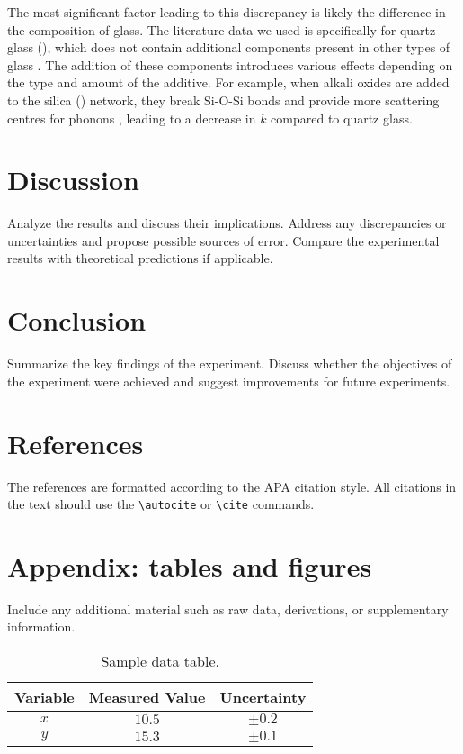 \documentclass[a4paper,12pt]{article}
\begin{document}
The most significant factor leading to this discrepancy is likely the difference in the composition of glass. The literature data we used is specifically for quartz glass (), which does not contain additional components present in other types of glass \autocite{onoda1999introduction}. The addition of these components introduces various effects depending on the type and amount of the additive. For example, when alkali oxides are added to the silica () network, they break Si-O-Si bonds and provide more scattering centres for phonons \autocite{article}, leading to a decrease in $k$ compared to quartz glass.

\section{Discussion}
\label{sec:discussion}
Analyze the results and discuss their implications. Address any discrepancies or uncertainties and propose possible sources of error. Compare the experimental results with theoretical predictions if applicable.

\section{Conclusion}
\label{sec:conclusion}
Summarize the key findings of the experiment. Discuss whether the objectives of the experiment were achieved and suggest improvements for future experiments.

\section{References}
\label{sec:references}
The references are formatted according to the APA citation style. All citations in the text should use the \texttt{\textbackslash autocite} or \texttt{\textbackslash cite} commands.

\printbibliography %

\newpage
\appendix
\section{Appendix: tables and figures}
\label{sec:appendix}
Include any additional material such as raw data, derivations, or supplementary information.

\begin{table}[H]
    \centering
    \begin{tabular}{|c|c|c|}
        \hline
        Variable & Measured Value & Uncertainty \\ 
        \hline
        $x$ & $10.5$ & $\pm0.2$ \\ 
        $y$ & $15.3$ & $\pm0.1$ \\ 
        \hline
    \end{tabular}
    \caption{Sample data table.}
    \label{tab:example_table}
\end{table}
\end{document}
